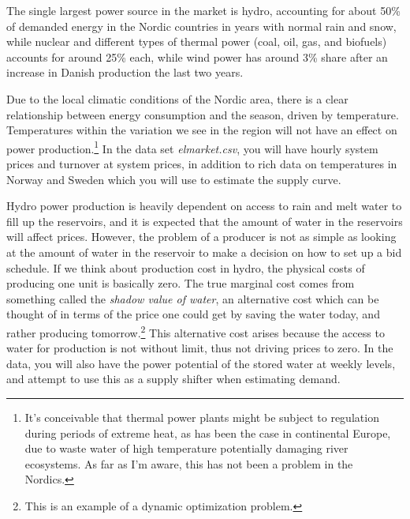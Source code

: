 \documentclass[12pt,a4paper]{article}
\begin{document}
The single largest power source in the market is hydro, accounting for about 50\% of demanded energy in the Nordic countries in years with normal rain and snow, while nuclear and different types of thermal power (coal, oil, gas, and biofuels) accounts for around 25\% each, while wind power has around 3\% share after an increase in Danish production the last two years.

Due to the local climatic conditions of the Nordic area, there is a clear relationship between energy consumption and the season, driven by temperature. Temperatures within the variation we see in the region will not have an effect on power production.\footnote{It's conceivable that thermal power plants might be subject to regulation during periods of extreme heat, as has been the case in continental Europe, due to waste water of high temperature potentially damaging river ecosystems. As far as I'm aware, this has not been a problem in the Nordics.} In the data set \emph{elmarket.csv}, you will have hourly system prices and turnover at system prices, in addition to rich data on temperatures in Norway and Sweden which you will use to estimate the supply curve.

Hydro power production is heavily dependent on access to rain and melt water to fill up the reservoirs, and it is expected that the amount of water in the reservoirs will affect prices. However, the problem of a producer is not as simple as looking at the amount of water in the reservoir to make a decision on how to set up a bid schedule. If we think about production cost in hydro, the physical costs of producing one unit is basically zero. The true marginal cost comes from something called the \emph{shadow value of water}, an alternative cost which can be thought of in terms of the price one could get by saving the water today, and rather producing tomorrow.\footnote{This is an example of a dynamic optimization problem.} This alternative cost arises because the access to water for production is not without limit, thus not driving prices to zero. In the data, you will also have the power potential of the stored water at weekly levels, and attempt to use this as a supply shifter when estimating demand.
\end{document}
